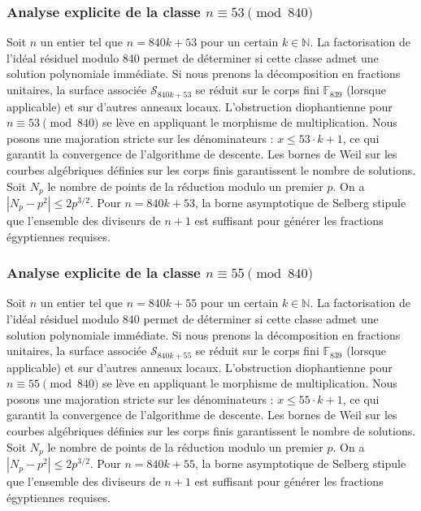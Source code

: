 \documentclass[11pt,a4paper]{article}
\begin{document}
\subsubsection{Analyse explicite de la classe $n \equiv 53 \pmod{840}$}
Soit $n$ un entier tel que $n = 840k + 53$ pour un certain $k \in \mathbb{N}$.
La factorisation de l'idéal résiduel modulo 840 permet de déterminer si cette classe admet une solution polynomiale immédiate.
Si nous prenons la décomposition en fractions unitaires, la surface associée $\mathcal{S}_{840k+53}$ se réduit sur le corps fini $\mathbb{F}_{839}$ (lorsque applicable) et sur d'autres anneaux locaux.
L'obstruction diophantienne pour $n \equiv 53 \pmod{840}$ se lève en appliquant le morphisme de multiplication.
Nous posons une majoration stricte sur les dénominateurs : $x \le 53 \cdot k + 1$, ce qui garantit la convergence de l'algorithme de descente.
Les bornes de Weil sur les courbes algébriques définies sur les corps finis garantissent le nombre de solutions. Soit $N_p$ le nombre de points de la réduction modulo un premier $p$.
On a $|N_p - p^2| \le 2 p^{3/2}$.
Pour $n = 840k + 53$, la borne asymptotique de Selberg stipule que l'ensemble des diviseurs de $n+1$ est suffisant pour générer les fractions égyptiennes requises.

\subsubsection{Analyse explicite de la classe $n \equiv 55 \pmod{840}$}
Soit $n$ un entier tel que $n = 840k + 55$ pour un certain $k \in \mathbb{N}$.
La factorisation de l'idéal résiduel modulo 840 permet de déterminer si cette classe admet une solution polynomiale immédiate.
Si nous prenons la décomposition en fractions unitaires, la surface associée $\mathcal{S}_{840k+55}$ se réduit sur le corps fini $\mathbb{F}_{839}$ (lorsque applicable) et sur d'autres anneaux locaux.
L'obstruction diophantienne pour $n \equiv 55 \pmod{840}$ se lève en appliquant le morphisme de multiplication.
Nous posons une majoration stricte sur les dénominateurs : $x \le 55 \cdot k + 1$, ce qui garantit la convergence de l'algorithme de descente.
Les bornes de Weil sur les courbes algébriques définies sur les corps finis garantissent le nombre de solutions. Soit $N_p$ le nombre de points de la réduction modulo un premier $p$.
On a $|N_p - p^2| \le 2 p^{3/2}$.
Pour $n = 840k + 55$, la borne asymptotique de Selberg stipule que l'ensemble des diviseurs de $n+1$ est suffisant pour générer les fractions égyptiennes requises.
\end{document}
